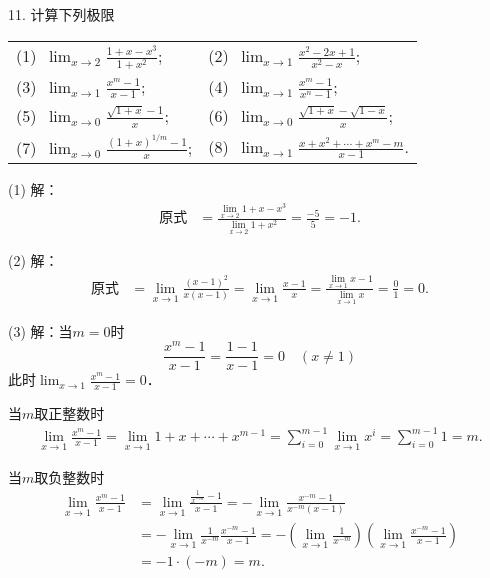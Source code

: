 11. 计算下列极限
\begin{table}[H]
    \centering
    \begin{tabularx}{\textwidth} {  >{\raggedright\arraybackslash}X >{\raggedright\arraybackslash}X  }
       (1)~$\displaystyle\lim_{x \to 2}\displaystyle\frac{1+x-x^3}{1+x^2}$; & (2)~$\displaystyle\lim_{x \to 1}\displaystyle\frac{x^2-2x+1}{x^2-x}$; \\ [1em]
       (3)~$\displaystyle\lim_{x \to 1}\displaystyle\frac{x^m-1}{x-1}$; & (4)~$\displaystyle\lim_{x \to 1}\displaystyle\frac{x^m-1}{x^n-1}$; \\ [1em]
       (5)~$\displaystyle\lim_{x \to 0}\displaystyle\frac{\sqrt{1+x}-1}{x}$; & (6)~$\displaystyle\lim_{x \to 0}\displaystyle\frac{\sqrt{1+x}-\sqrt{1-x}}{x}$; \\ [1em]
       (7)~$\displaystyle\lim_{x \to 0}\displaystyle\frac{(1+x)^{1/m}-1}{x}$; & (8)~$\displaystyle\lim_{x \to 1}\displaystyle\frac{x+x^2+\cdots+x^m-m}{x-1}$.
      \end{tabularx}
\end{table}

(1) 解：
\begin{align}
    \text{原式} &= \displaystyle\frac{\displaystyle\lim_{x \to 2} 1+x-x^3}{\displaystyle\lim_{x \to 2} 1+x^2} = \displaystyle\frac{-5}{5} = -1.
\end{align}

(2) 解：
\begin{align}
    \text{原式} &= \lim_{x \to 1} \displaystyle\frac{(x-1)^2}{x(x-1)} = \lim_{x \to 1} \displaystyle\frac{x-1}{x} = \displaystyle\frac{\displaystyle\lim_{x \to 1} x-1}{\displaystyle\lim_{x \to 1} x} = \frac{0}{1} = 0.
\end{align}

(3) 解：当$m=0$时
\begin{equation}
    \frac{x^m-1}{x-1} = \frac{1-1}{x-1} = 0 \quad (x \neq 1)
\end{equation}
此时$\displaystyle\lim_{x \to 1} \displaystyle\frac{x^m-1}{x-1}=0$．

当$m$取正整数时
\begin{align}
    \lim_{x \to 1}\displaystyle\frac{x^m-1}{x-1} = \displaystyle\lim_{x \to 1} 1+x+\cdots+x^{m-1} = \sum_{i=0}^{m-1} \lim_{x \to 1} x^i = \sum_{i=0}^{m-1} 1 = m.
\end{align}

当$m$取负整数时
\begin{align}
    \lim_{x \to 1}\displaystyle\frac{x^m-1}{x-1} &= \lim_{x \to 1} \displaystyle\frac{\displaystyle\frac{1}{x^{-m}}-1}{x-1} = - \lim_{x \to 1} \displaystyle\frac{x^{-m}-1}{x^{-m}(x-1)} \\
    &=- \lim_{x \to 1} \displaystyle\frac{1}{x^{-m}} \frac{x^{-m}-1}{x-1} = -\left( \lim_{x \to 1} \displaystyle\frac{1}{x^{-m}} \right) \left( \lim_{x \to 1} \displaystyle \frac{x^{-m}-1}{x-1} \right) \\
    &= - 1 \cdot (-m)  = m .
\end{align}

